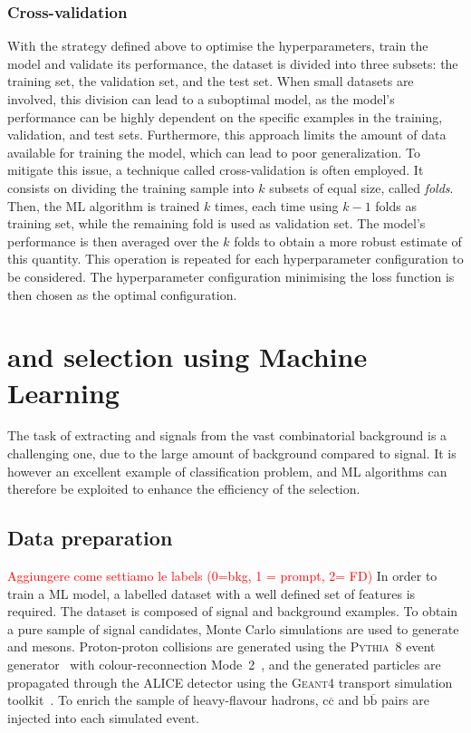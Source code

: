 \subsubsection{Cross-validation}

With the strategy defined above to optimise the hyperparameters, train the model and validate its performance, the dataset is divided into three subsets: the training set, the validation set, and the test set. When small datasets are involved, this division can lead to a suboptimal model, as the model's performance can be highly dependent on the specific examples in the training, validation, and test sets. Furthermore, this approach limits the amount of data available for training the model, which can lead to poor generalization. To mitigate this issue, a technique called cross-validation is often employed. It consists on dividing the training sample into $k$ subsets of equal size, called \emph{folds}. Then, the ML algorithm is trained $k$ times, each time using $k-1$ folds as training set, while the remaining fold is used as validation set. The model's performance is then averaged over the $k$ folds to obtain a more robust estimate of this quantity. This operation is repeated for each hyperparameter configuration to be considered. The hyperparameter configuration minimising the loss function is then chosen as the optimal configuration.

\section{\texorpdfstring{\ds and \dpl selection using Machine Learning}{Ds+ and D+ selection using Machine Learning}}

The task of extracting \ds and \dpl signals from the vast combinatorial background is a challenging one, due to the large amount of background compared to signal. It is however an excellent example of classification problem, and ML algorithms can therefore be exploited to enhance the efficiency of the selection. 

\subsection{Data preparation}
\textcolor{red}{Aggiungere come settiamo le labels (0=bkg, 1 = prompt, 2= FD)}
In order to train a ML model, a labelled dataset with a well defined set of features is required. The dataset is composed of signal and background examples. To obtain a pure sample of signal candidates, Monte Carlo simulations are used to generate \ds and \dpl mesons. Proton-proton collisions are generated using the \textsc{Pythia~8} event generator~\cite{Bierlich:2022pfr} with colour-reconnection Mode~2~\cite{Christiansen:2015yqa}, and the generated particles are propagated through the ALICE detector using the \textsc{Geant4} transport simulation toolkit~\cite{GEANT4:2002zbu}. To enrich the sample of heavy-flavour hadrons, $\mathrm{c\overline{c}}$ and $\mathrm{b\overline{b}}$ pairs are injected into each simulated event. 


